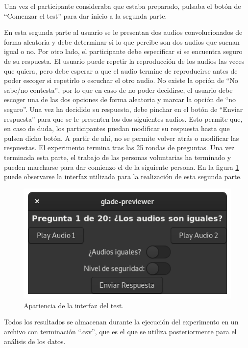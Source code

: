 \documentclass[11pt,a4paper,twoside]{book}
\begin{document}
                Una vez el participante consideraba que estaba preparado, pulsaba el botón de ``Comenzar el test'' para dar inicio a la segunda parte.
                
                En esta segunda parte al usuario se le presentan dos audios convolucionados de forma aleatoria y debe determinar si lo que percibe son dos audios que suenan igual o no. Por otro lado, el participante debe especificar si se encuentra seguro de su respuesta. El usuario puede repetir la reproducción de los audios las veces que quiera, pero debe esperar a que el audio termine de reproducirse antes de poder escoger si repetirlo o escuchar el otro audio. No existe la opción de ``No sabe/no contesta'', por lo que en caso de no poder decidirse, el usuario debe escoger una de las dos opciones de forma aleatoria y marcar la opción de ``no seguro''. Una vez ha decidido su respuesta, debe pinchar en el botón de ``Enviar respuesta'' para que se le presenten los dos siguientes audios. Esto permite que, en caso de duda, los participantes puedan modificar su respuesta hasta que pulsen dicho botón. A partir de ahí, no se permite volver atrás o modificar las respuestas. El experimento termina tras las 25 rondas de preguntas. Una vez terminada esta parte, el trabajo de las personas voluntarias ha terminado y pueden marcharse para dar comienzo el de la siguiente persona. En la figura \ref{fig:interfazTestFin} puede observarse la interfaz utilizada para la realización de esta segunda parte.
                
                \begin{figure}
                    \includegraphics[scale=0.6]{../imagenes/interFin.png}
			        \centering
			        \caption{Apariencia de la interfaz del test.}
			        \label{fig:interfazTestFin}
                \end{figure}
                
                Todos los resultados se almacenan durante la ejecución del experimento en un archivo con terminación ``.csv'', que es el que se utiliza posteriormente para el análisis de los datos.
                
\end{document}
